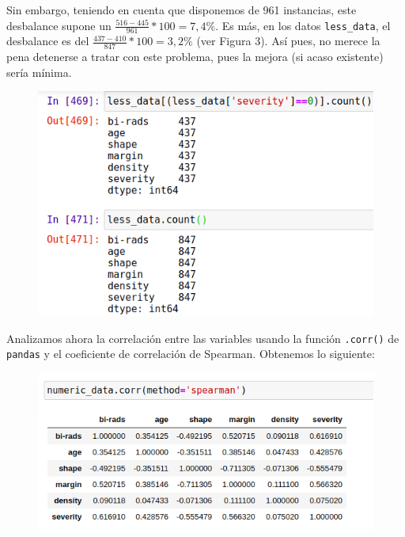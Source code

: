 \documentclass[a4paper,11pt]{article}
\begin{document}
Sin embargo, teniendo en cuenta que disponemos de 961 instancias, este desbalance supone un $\frac{516-445}{961} * 100 = 7,4\%$. Es más, en los datos \texttt{less_data}, el desbalance es del $\frac{437-410}{847} * 100 = 3,2\%$ (ver Figura 3). Así pues, no merece la pena detenerse a tratar con este problema, pues la mejora (si acaso existente) sería mínima. 

\begin{figure}[H]
	\centering
	\includegraphics[width=0.9\linewidth]{img/image3}
	\caption{}
	\label{fig:image3}
\end{figure}

Analizamos ahora la correlación entre las variables usando la función \texttt{.corr()} de \texttt{pandas} y el coeficiente de correlación de Spearman. Obtenemos lo siguiente:

\begin{figure}[H]
	\centering
	\includegraphics[width=1\linewidth]{img/image4}
	\caption{}
	\label{fig:image4}
\end{figure}
\end{document}
